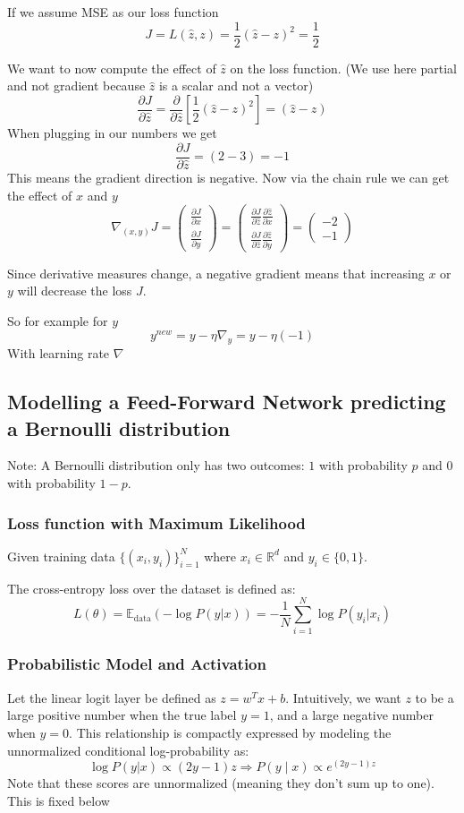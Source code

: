 \documentclass{article}
\begin{document}
If we assume MSE as our loss function
\[J = L(\hat{z},z) = \frac{1}{2}(\hat{z}-z)^2 = \frac{1}{2}\]

We want to now compute the effect of $\hat{z}$ on the loss function. (We use here partial and not gradient because $\hat{z}$ is a scalar and not a vector)
\[\frac{\partial J }{\partial \hat{z}} = \frac{\partial}{\partial \hat{z}}\left[\frac{1}{2}(\hat{z} - z)^2\right] = (\hat{z} - z)\]
When plugging in our numbers we get
\[\frac{\partial J}{\partial \hat{z}} = (2-3) = -1\]
This means the gradient direction is negative. Now via the chain rule we can get the effect of $x$ and $y$
\[\nabla_{(x,y)}J = \begin{pmatrix}
  \frac{\partial J}{\partial x} \\
  \frac{\partial J}{\partial y} 
\end{pmatrix} = \begin{pmatrix}
  \frac{\partial J}{\partial \hat{z}}\frac{\partial \hat{z}}{\partial x} \\
  \frac{\partial J}{\partial \hat{z}}\frac{\partial \hat{z}}{\partial y}
\end{pmatrix} = \begin{pmatrix}
  -2 \\
  -1
\end{pmatrix}\]

Since derivative measures change, a negative gradient means that increasing $x$ or $y$ will decrease the loss $J$.


So for example for $y$
\[y^{new} = y - \eta \nabla_y = y - \eta(-1)\]
With learning rate $\nabla$


\subsection{Modelling a Feed-Forward Network predicting a Bernoulli distribution}
Note: A Bernoulli distribution only has two outcomes: $1$ with probability $p$ and $0$ with probability $1-p$.

\subsubsection{Loss function with Maximum Likelihood}
Given training data $\{(x_i,y_i)\}_{i=1}^N$ where $x_i \in \mathbb{R}^d$ and $y_i \in \{0,1\}$.

The cross-entropy loss over the dataset is defined as:
\[L(\theta) = \mathbb{E}_{\text{data}}(-\log P(y|x)) = - \frac{1}{N}\sum_{i=1}^N \log P(y_i|x_i)\]
\subsubsection{Probabilistic Model and Activation}
Let the linear logit layer be defined as $z = w^T x + b$. Intuitively, we want $z$ to be a large positive number when the true label $y=1$, and a large negative number when $y=0$. This relationship is compactly expressed by modeling the unnormalized conditional log-probability as:
\[\log P(y|x) \propto (2y-1)z \Rightarrow P(y \mid x) \propto e^{(2y-1)z}\]
Note that these scores are unnormalized (meaning they don't sum up to one). This is fixed below
\end{document}
